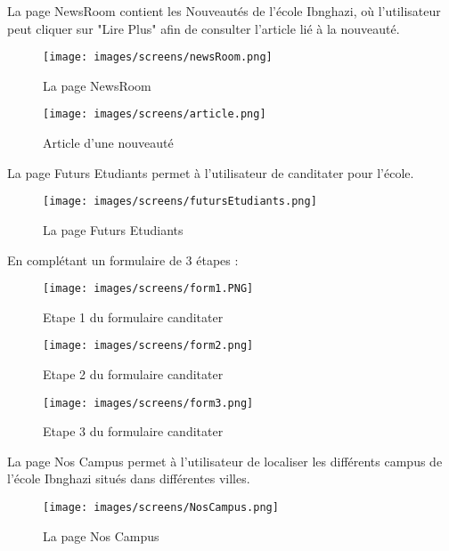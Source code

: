 \newpage
La page NewsRoom contient les Nouveautés de l'école Ibnghazi, où l'utilisateur peut cliquer sur "Lire Plus" afin de consulter l'article lié à la nouveauté.
\begin{figure}[h]
    \begin{minipage}[c]{.46\linewidth}
        \centering
        \texttt{[image: images/screens/newsRoom.png]}
        \caption{La page NewsRoom}
    \end{minipage}
    \hfill%
    \begin{minipage}[c]{.46\linewidth}
        \centering
        \texttt{[image: images/screens/article.png]}
        \caption{Article d'une nouveauté}
    \end{minipage}
\end{figure}
\newpage

La page Futurs Etudiants permet à l'utilisateur de canditater pour l'école.
\begin{figure}[!h]  
\begin{center}
\texttt{[image: images/screens/futursEtudiants.png]}
\end{center}
\caption{La page Futurs Etudiants}
\end{figure}

En complétant un formulaire de 3 étapes :
\begin{figure}[h]
    \begin{minipage}[c]{.46\linewidth}
        \centering
        \texttt{[image: images/screens/form1.PNG]}
        \caption{Etape 1 du formulaire canditater}
    \end{minipage}
    \hfill%
    \begin{minipage}[c]{.46\linewidth}
        \centering
        \texttt{[image: images/screens/form2.png]}
        \caption{Etape 2 du formulaire canditater}
    \end{minipage}
\end{figure}
\newpage
\begin{figure}[!h]  
\begin{center}
\texttt{[image: images/screens/form3.png]}
\end{center}
\caption{Etape 3 du formulaire canditater}
\end{figure}

La page Nos Campus permet à l'utilisateur de localiser les différents campus de l'école Ibnghazi situés dans différentes villes.
\begin{figure}[!h]  
\begin{center}
\texttt{[image: images/screens/NosCampus.png]}
\end{center}
\caption{La page Nos Campus}
\end{figure}
\newpage

